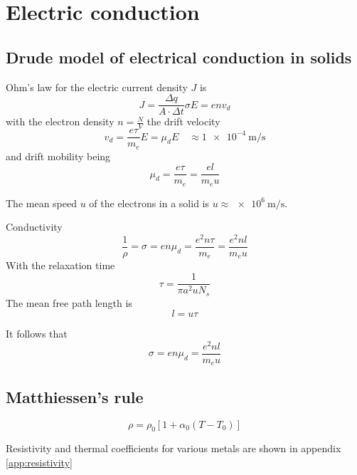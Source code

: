 \section{Electric conduction}

\subsection{Drude model of electrical conduction in solids}

Ohm's law for the electric current density $J$ is
\begin{equation}
    J = \frac{\Delta q}{A \cdot \Delta t}\sigma E = e n v_d
\end{equation}
with the electron density $n = \frac{N}{V}$ the drift velocity
\begin{equation}
    v_d = \frac{e \tau}{m_e} E = \mu_d E \quad \approx \SI{1e-4}{\meter\per\second}
\end{equation}
and drift mobility being
\begin{equation}
    \mu_d = \frac{e \tau}{m_e} = \frac{e l}{m_e u}
\end{equation}

The mean speed $u$ of the electrons in a solid is $u\approx\SI{e6}{\meter\per\second}$.

Conductivity
\begin{equation}
    \frac{1}{\rho} = \sigma = e n \mu_d = \frac{e^2 n \tau}{m_e} = \frac{e^2 n l}{m_e u}
\end{equation}
With the relaxation time
\begin{equation}
    \tau = \frac{1}{\pi a^2 u N_s}
\end{equation}
The mean free path length is
\begin{equation}
    l = u \tau
\end{equation}

It follows that
\begin{equation}
    \sigma = e n \mu_d = \frac{e^2 n l}{m_e u}
\end{equation}

\subsection{Matthiessen's rule}
\begin{equation}
    \rho = \rho_0 \left[ 1 + \alpha_0 \left( T - T_0 \right) \right]
\end{equation}

Resistivity and thermal coefficients for various metals are shown in appendix \ref{app:resistivity}

